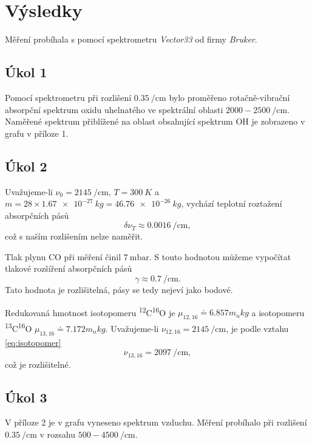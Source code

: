 \documentclass{protokol}
\begin{document}
    
  \section*{Výsledky}

    Měření probíhala s pomocí spektrometru \textit{Vector33} od firmy \textit{Bruker}.

    \subsection*{Úkol 1}

      Pomocí spektrometru při rozlišení $\SI{0.35}{\per\centi\metre}$ bylo proměřeno rotačně-vibrační absorpční spektrum oxidu uhelnatého ve spektrální oblasti $2000 - \SI{2500}{\per\centi\metre}$. Naměřené spektrum přiblížené na oblast obsahující spektrum OH je zobrazeno v grafu v příloze 1.

    \subsection*{Úkol 2}

      Uvažujeme-li $\nu_0 = \SI{2145}{\per\centi\metre}$, $T = \SI{300}{K}$ a $m = 28 \times \SI{1.67 e-27}{kg} = \SI{46.76 e-26}{kg}$, vychází teplotní roztažení absorpčních pásů
      $$ \delta \nu_T \approx \SI{0.0016}{\per\centi\metre}, $$
      což s naším rozlišením nelze naměřit.

      Tlak plynu CO při měření činil $\SI{7}{\milli\bar}$. S touto hodnotou můžeme vypočítat tlakové rozšíření absorpčních pásů
      $$ \gamma \approx \SI{0.7}{\per\centi\metre}. $$ 
      Tato hodnota je rozlišitelná, pásy se tedy nejeví jako bodové.

      Redukovaná hmotnost isotopomeru \textsuperscript{12}C\textsuperscript{16}O je $\mu_{12,16} \doteq \num{6.857}m_n\si{kg}$ a isotopomeru \textsuperscript{13}C\textsuperscript{16}O $ \mu_{13,16} \doteq \num{7.172}m_n\si{kg} $. Uvažujeme-li $\nu_{12,16} = \SI{2145}{\per\centi\metre}$, je podle vztahu \eqref{eq:isotopomer}
      $$ \nu_{13,16} = \SI{2097}{\per\centi\metre}, $$ 
      což je rozlišitelné.

    \subsection*{Úkol 3}

      V příloze 2 je v grafu vyneseno spektrum vzduchu. Měření probíhalo při rozlišení $\SI{0.35}{\per\centi\metre}$ v rozsahu $500 - \SI{4500}{\per\centi\metre}$. 
\end{document}
